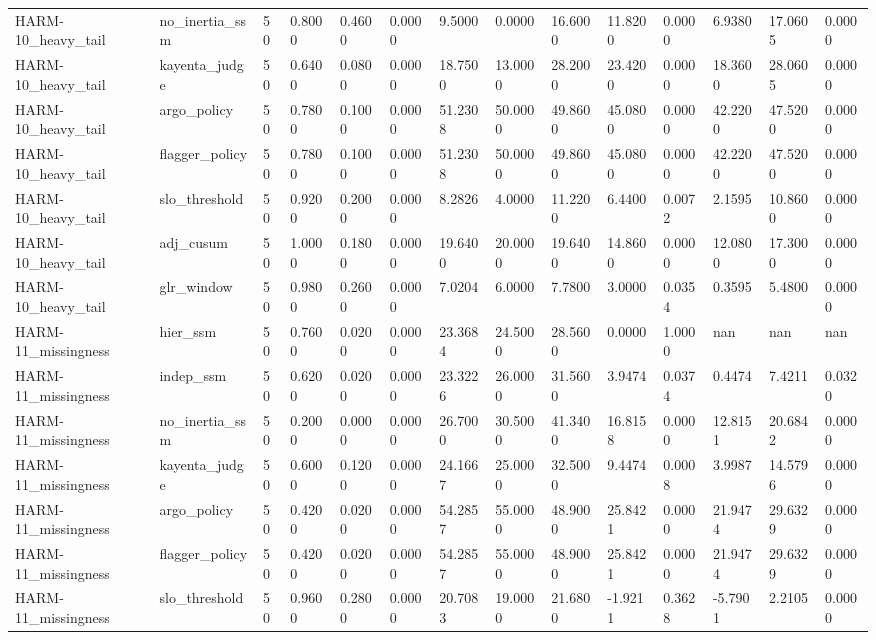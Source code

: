 \begin{table}[htbp]
\begin{tabular}{llllllllllllll}
HARM-10\_heavy\_tail & no\_inertia\_ssm & 50 & 0.8000 & 0.4600 & 0.0000 & 9.5000 & 0.0000 & 16.6000 & 11.8200 & 0.0000 & 6.9380 & 17.0605 & 0.0000 \\
HARM-10\_heavy\_tail & kayenta\_judge & 50 & 0.6400 & 0.0800 & 0.0000 & 18.7500 & 13.0000 & 28.2000 & 23.4200 & 0.0000 & 18.3600 & 28.0605 & 0.0000 \\
HARM-10\_heavy\_tail & argo\_policy & 50 & 0.7800 & 0.1000 & 0.0000 & 51.2308 & 50.0000 & 49.8600 & 45.0800 & 0.0000 & 42.2200 & 47.5200 & 0.0000 \\
HARM-10\_heavy\_tail & flagger\_policy & 50 & 0.7800 & 0.1000 & 0.0000 & 51.2308 & 50.0000 & 49.8600 & 45.0800 & 0.0000 & 42.2200 & 47.5200 & 0.0000 \\
HARM-10\_heavy\_tail & slo\_threshold & 50 & 0.9200 & 0.2000 & 0.0000 & 8.2826 & 4.0000 & 11.2200 & 6.4400 & 0.0072 & 2.1595 & 10.8600 & 0.0000 \\
HARM-10\_heavy\_tail & adj\_cusum & 50 & 1.0000 & 0.1800 & 0.0000 & 19.6400 & 20.0000 & 19.6400 & 14.8600 & 0.0000 & 12.0800 & 17.3000 & 0.0000 \\
HARM-10\_heavy\_tail & glr\_window & 50 & 0.9800 & 0.2600 & 0.0000 & 7.0204 & 6.0000 & 7.7800 & 3.0000 & 0.0354 & 0.3595 & 5.4800 & 0.0000 \\
HARM-11\_missingness & hier\_ssm & 50 & 0.7600 & 0.0200 & 0.0000 & 23.3684 & 24.5000 & 28.5600 & 0.0000 & 1.0000 & nan & nan & nan \\
HARM-11\_missingness & indep\_ssm & 50 & 0.6200 & 0.0200 & 0.0000 & 23.3226 & 26.0000 & 31.5600 & 3.9474 & 0.0374 & 0.4474 & 7.4211 & 0.0320 \\
HARM-11\_missingness & no\_inertia\_ssm & 50 & 0.2000 & 0.0000 & 0.0000 & 26.7000 & 30.5000 & 41.3400 & 16.8158 & 0.0000 & 12.8151 & 20.6842 & 0.0000 \\
HARM-11\_missingness & kayenta\_judge & 50 & 0.6000 & 0.1200 & 0.0000 & 24.1667 & 25.0000 & 32.5000 & 9.4474 & 0.0008 & 3.9987 & 14.5796 & 0.0000 \\
HARM-11\_missingness & argo\_policy & 50 & 0.4200 & 0.0200 & 0.0000 & 54.2857 & 55.0000 & 48.9000 & 25.8421 & 0.0000 & 21.9474 & 29.6329 & 0.0000 \\
HARM-11\_missingness & flagger\_policy & 50 & 0.4200 & 0.0200 & 0.0000 & 54.2857 & 55.0000 & 48.9000 & 25.8421 & 0.0000 & 21.9474 & 29.6329 & 0.0000 \\
HARM-11\_missingness & slo\_threshold & 50 & 0.9600 & 0.2800 & 0.0000 & 20.7083 & 19.0000 & 21.6800 & -1.9211 & 0.3628 & -5.7901 & 2.2105 & 0.0000 \\

\end{tabular}
\end{table}
